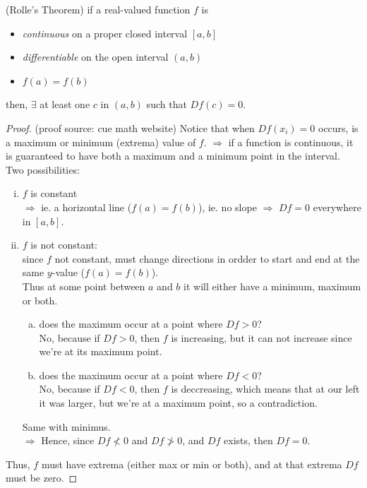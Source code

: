 \documentclass{article}
\theoremstyle{definition}
\newenvironment{thm}[1]
{\renewcommand\theinnerthm{#1}\innerthm}
{\endinnerthm}
\begin{document}
\begin{thm}{}(Rolle's Theorem)
  if a real-valued function $f$ is
  \begin{itemize}
    \item \emph{continuous} on a proper closed interval $[a,b]$
    \item \emph{differentiable} on the open interval $(a,b)$
    \item $f(a)=f(b)$
  \end{itemize}
  then, $\exists$ at least one $c$ in $(a,b)$ such that $Df(c)=0$.
\end{thm}
\begin{proof} (proof source: cue math website)
  Notice that when $Df(x_i)=0$ occurs, is a maximum or minimum (extrema) value of $f$.
  $\Longrightarrow$ if a function is continuous, it is guaranteed to have both a maximum and a minimum point in the interval.\\

  Two possibilities:
  \begin{enumerate}[i.]
    \item $f$ is constant\\
    $\Longrightarrow$ ie. a horizontal line ($f(a)=f(b)$), ie. no slope $\Longrightarrow$ $Df=0$ everywhere in $[a,b]$.
  \item $f$ is not constant:\\
    since $f$ not constant, must change directions in ordder to start and end at the same $y$-value ($f(a)=f(b)$).\\
    Thus at some point between $a$ and $b$ it will either have a minimum, maximum or both.
    \begin{enumerate}[a.]
      \item does the maximum occur at a point where $Df > 0$?\\
	No, because if $Df > 0$, then $f$ is increasing, but it can not increase since we're at its maximum point.
      \item does the maximum occur at a point where $Df < 0$?\\
	No, because if $Df < 0$, then $f$ is deccreasing, which means that at our left it was larger, but we're at a maximum point, so a contradiction.
    \end{enumerate}
    Same with minimus.\\
    $\Longrightarrow$ Hence, since $Df \nless 0$ and $Df \ngtr 0$, and $Df$ exists, then $Df=0$.
  \end{enumerate}
    Thus, $f$ must have extrema (either max or min or both), and at that extrema $Df$ must be zero.
\end{proof}
\end{document}
